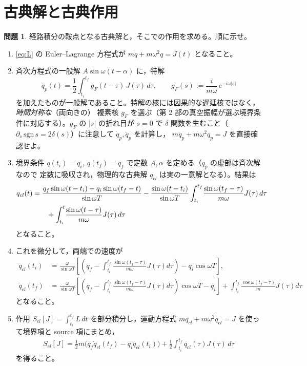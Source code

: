 \documentclass[dvipdfmx, uplatex]{jsarticle}
\theoremstyle{definition}
\newtheorem{prob}{問題}
\begin{document}
\section{古典解と古典作用}

\begin{prob}\label{prob:cl}
経路積分の鞍点となる古典解と，そこでの作用を求める。順に示せ。
\begin{enumerate}
\item \eqref{eq:L} の Euler--Lagrange 方程式が $m\ddot q+m\omega^2 q=J(t)$ となること。
\item 斉次方程式の一般解 $A\sin\omega(t-\alpha)$ に，特解
\[
    q_p(t)=\frac12\int_{t_i}^{t_f} g_F(t-\tau)\,J(\tau)\,d\tau,
    \qquad g_F(s):=\frac{i}{m\omega}\,e^{-i\omega|s|}
\]
を加えたものが一般解であること。特解の核には因果的な遅延核ではなく，\emph{時間対称な}（両向きの）
複素核 $g_F$ を選ぶ（第 2 部の真空振幅が選ぶ境界条件に対応する）。$g_F$ の $|s|$ の折れ目が $s=0$ で
$\delta$ 関数を生むこと（$\partial_s\,\mathrm{sgn}\,s=2\delta(s)$）に注意して $\dot q_p,\ddot q_p$ を計算し，
$m\ddot q_p+m\omega^2 q_p=J$ を直接確認せよ。
\item 境界条件 $q(t_i)=q_i,\ q(t_f)=q_f$ で定数 $A,\alpha$ を定める（$q_p$ の虚部は斉次解なので
定数に吸収され，物理的な古典解 $q_{cl}$ は実の一意解となる）。結果は
\begin{align}
    q_{cl}(t)
    &=
    \frac{q_f\sin\omega(t-t_i)+q_i\sin\omega(t_f-t)}{\sin\omega T}
    -\frac{\sin\omega(t-t_i)}{\sin\omega T}
    \int_{t_i}^{t_f}\!\frac{\sin\omega(t_f-\tau)}{m\omega}J(\tau)\,d\tau
    \notag\\&\qquad
    +\int_{t_i}^{t}\!\frac{\sin\omega(t-\tau)}{m\omega}J(\tau)\,d\tau
\label{eq:qcl}
\end{align}
となること。
\item これを微分して，両端での速度が
\begin{subequations}\label{eq:qcldot}
\begin{align}
    \dot{q}_{cl}(t_i)
    &=
    \frac{\omega}{\sin\omega T}
    \left[\left(q_f-\int_{t_i}^{t_f}\!\frac{\sin\omega(t_f-\tau)}{m\omega}J(\tau)d\tau\right)
    -q_i\cos\omega T\right],
    \\
    \dot{q}_{cl}(t_f)
    &=
    \frac{\omega}{\sin\omega T}
    \left[\left(q_f-\int_{t_i}^{t_f}\!\frac{\sin\omega(t_f-\tau)}{m\omega}J(\tau)d\tau\right)\cos\omega T
    -q_i\right]
    +\int_{t_i}^{t_f}\!\frac{\cos\omega(t_f-\tau)}{m}J(\tau)d\tau
\end{align}
\end{subequations}
となること。
\item 作用 $S_{cl}[J]=\int_{t_i}^{t_f}L\,dt$ を部分積分し，運動方程式
$m\ddot q_{cl}+m\omega^2q_{cl}=J$ を使って境界項と source 項にまとめ，
\begin{align}
    S_{cl}[J]
    =\frac12 m\big(q_f\dot q_{cl}(t_f)-q_i\dot q_{cl}(t_i)\big)
    +\frac12\int_{t_i}^{t_f}\! q_{cl}(\tau)J(\tau)\,d\tau
\label{eq:Scl}
\end{align}
を得ること。
\end{enumerate}
\end{prob}
\end{document}
